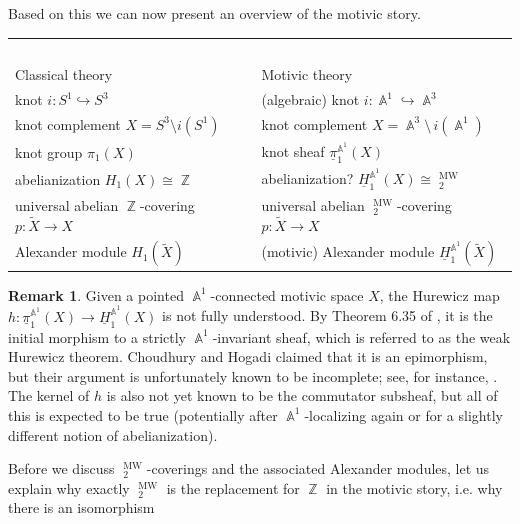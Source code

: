 \documentclass[english]{amsart}
\theoremstyle{definition}
\newtheorem{rem}[prop]{Remark}
\DeclareMathOperator{\Z}{\mathbb{Z}}
\DeclareMathOperator{\A}{\mathbb{A}}
\DeclareMathOperator{\KK}{\underline{K}}
\DeclareMathOperator{\MW}{MW}
\begin{document}
Based on this we can now present an overview of the motivic story.
\vspace*{-15pt}
\begin{center}
\def\arraystretch{1.5}
\begin{tabular}{ p{7cm} p{7cm} }\label{Table}


$\phantom{1}$ & $\phantom{1}$ \\

Classical theory & Motivic theory \\

\hline
knot $i \colon S^1 \hookrightarrow S^3$ & (algebraic) knot $i \colon \A^1 \hookrightarrow \A^3$ \\
knot complement $X = S^3 \setminus i(S^1)$ & knot complement $X = \A^3 \setminus \hspace{2pt} i(\A^1)$ \\
knot group $\pi_1(X)$ & knot sheaf $\underline{\pi}_1^{\A^1}\!(X)$ \\
abelianization $H_1(X) \cong \Z$ & abelianization? $\underline{H}_1^{\A^1}\!(X) \cong \KK^{\MW}_2$ \\
universal abelian $\Z$-covering $p \colon \widetilde{X} \rightarrow X$ & universal abelian $\KK^{\MW}_2$-covering $p \colon \widetilde{X} \rightarrow X$ \\
Alexander module $H_1(\widetilde{X})$ & (motivic) Alexander module $\underline{H}_1^{\A^1}\!(\widetilde{X})$
\end{tabular}
\end{center}
\begin{rem}\label{Motivic Hurewicz in deg 1}
Given a pointed $\A^1$-connected motivic space $X$, the Hurewicz map $h \colon \underline{\pi}_1^{\A^1}\!(X) \rightarrow \underline{H}_1^{\A^1}\!(X)$ is not fully understood. By Theorem 6.35 of \cite{MR2934577}, it is the initial morphism to a strictly $\A^1$-invariant sheaf, which is referred to as the weak Hurewicz theorem. Choudhury and Hogadi \cite{MR4442407} claimed that it is an epimorphism, but their argument is unfortunately known to be incomplete; see, for instance, \cite{zbMATH08029975}. The kernel of $h$ is also not yet known to be the commutator subsheaf, but all of this is expected to be true (potentially after $\A^1$-localizing again or for a slightly different notion of abelianization).
\end{rem}
Before we discuss $\KK^{\MW}_2$-coverings and the associated Alexander modules, let us explain why exactly $\KK^{\MW}_2$ is the replacement for $\Z$ in the motivic story, i.e. why there is an isomorphism
\end{document}
